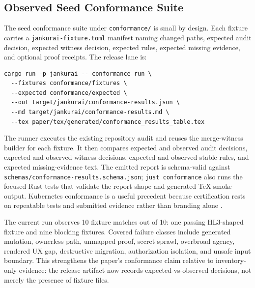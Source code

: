 \subsection{Observed Seed Conformance Suite}

The seed conformance suite under \texttt{conformance/} is small by design. Each fixture carries a \texttt{jankurai-fixture.toml} manifest naming changed paths, expected audit decision, expected witness decision, expected rules, expected missing evidence, and optional proof receipts. The release lane is:

\begin{lstlisting}[style=codebox]
cargo run -p jankurai -- conformance run \
  --fixtures conformance/fixtures \
  --expected conformance/expected \
  --out target/jankurai/conformance-results.json \
  --md target/jankurai/conformance-results.md \
  --tex paper/tex/generated/conformance_results_table.tex
\end{lstlisting}

The runner executes the existing repository audit and reuses the merge-witness builder for each fixture. It then compares expected and observed audit decisions, expected and observed witness decisions, expected and observed stable rules, and expected missing-evidence text. The emitted report is schema-valid against \texttt{schemas/conformance-results.schema.json}; \texttt{just conformance} also runs the focused Rust tests that validate the report shape and generated TeX smoke output. Kubernetes conformance is a useful precedent because certification rests on repeatable tests and submitted evidence rather than branding alone \cite{kubernetesConformance2026}.



The current run observes 10 fixture matches out of 10: one passing HL3-shaped fixture and nine blocking fixtures. Covered failure classes include generated mutation, ownerless path, unmapped proof, secret sprawl, overbroad agency, rendered UX gap, destructive migration, authorization isolation, and unsafe input boundary. This strengthens the paper's conformance claim relative to inventory-only evidence: the release artifact now records expected-vs-observed decisions, not merely the presence of fixture files.

